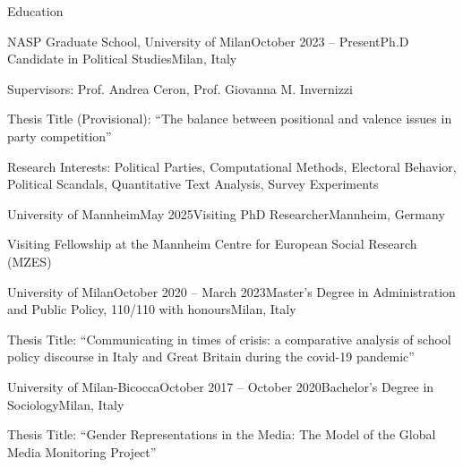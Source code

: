 \documentclass{cv} %
\begin{document}

\begin{rSection}{Education}

\begin{rSubsection}{NASP Graduate School, University of Milan}{October 2023 -- Present}{Ph.D Candidate in Political Studies}{Milan, Italy}
\item Supervisors: Prof. Andrea Ceron, Prof. Giovanna M. Invernizzi
\item Thesis Title (Provisional): “The balance between positional and valence issues in party competition”
\item Research Interests: Political Parties, Computational Methods, Electoral Behavior, Political Scandals, Quantitative Text Analysis, Survey Experiments
\end{rSubsection}

\begin{rSubsection}{University of Mannheim}{May 2025}{Visiting PhD Researcher}{Mannheim, Germany}
\item Visiting Fellowship at the Mannheim Centre for European Social Research (MZES)
\end{rSubsection}

\begin{rSubsection}{University of Milan}{October 2020 -- March 2023}{Master's Degree in Administration and Public Policy, 110/110 with honours}{Milan, Italy}
\item Thesis Title: “Communicating in times of crisis: a comparative analysis of school policy discourse in Italy and Great Britain during the covid-19 pandemic”
\end{rSubsection}

\begin{rSubsection}{University of Milan-Bicocca}{October 2017 -- October 2020}{Bachelor's Degree in Sociology}{Milan, Italy}
\item Thesis Title: “Gender Representations in the Media: The Model of the Global Media Monitoring Project”
\end{rSubsection}

\end{rSection}
\end{document}
